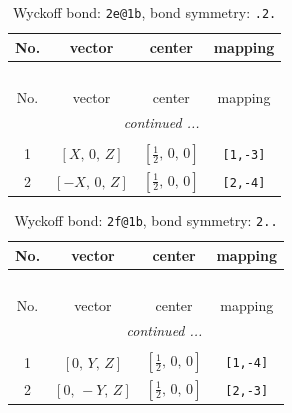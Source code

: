 \documentclass[fleqn,8pt]{jsarticle}
\begin{document}
\renewcommand{\arraystretch}{1.2}
\begin{longtable}{cccc}
\caption{Wyckoff bond: {\tt 2e@1b}, bond symmetry: {\tt .2.}}
 \\
 \hline \hline
No. & vector & center & mapping \\ \hline \endfirsthead

\multicolumn{3}{l}{\tablename\ \thetable{}} \\
 \hline \hline
No. & vector & center & mapping \\ \hline \endhead

 \hline \hline
\multicolumn{3}{r}{\footnotesize\it continued ...} \\ \endfoot

 \hline \hline
\multicolumn{3}{r}{} \\ \endlastfoot

1 & $\left[ X,\, 0,\, Z \right]$ & $\left[ \frac{1}{2},\, 0,\, 0 \right]$ & {\tt [1,-3]} \\ \hline
2 & $\left[ - X,\, 0,\, Z \right]$ & $\left[ \frac{1}{2},\, 0,\, 0 \right]$ & {\tt [2,-4]} \\
\end{longtable}
\renewcommand{\arraystretch}{1.2}
\begin{longtable}{cccc}
\caption{Wyckoff bond: {\tt 2f@1b}, bond symmetry: {\tt 2..}}
 \\
 \hline \hline
No. & vector & center & mapping \\ \hline \endfirsthead

\multicolumn{3}{l}{\tablename\ \thetable{}} \\
 \hline \hline
No. & vector & center & mapping \\ \hline \endhead

 \hline \hline
\multicolumn{3}{r}{\footnotesize\it continued ...} \\ \endfoot

 \hline \hline
\multicolumn{3}{r}{} \\ \endlastfoot

1 & $\left[ 0,\, Y,\, Z \right]$ & $\left[ \frac{1}{2},\, 0,\, 0 \right]$ & {\tt [1,-4]} \\ \hline
2 & $\left[ 0,\, - Y,\, Z \right]$ & $\left[ \frac{1}{2},\, 0,\, 0 \right]$ & {\tt [2,-3]} \\
\end{longtable}
\renewcommand{\arraystretch}{1.2}
\end{document}
